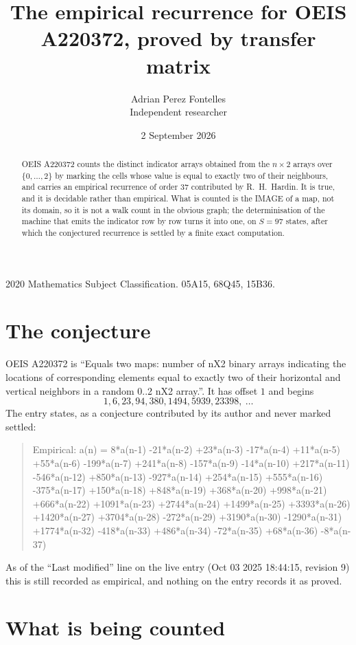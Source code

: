 \documentclass[11pt,a4paper]{article}
\title{The empirical recurrence for OEIS A220372, proved by transfer matrix}
\author{Adrian Perez Fontelles\\ \small Independent researcher}
\date{2 September 2026}
\theoremstyle{plain}
\theoremstyle{definition}
\begin{document}
\maketitle

\begin{abstract}
OEIS A220372 counts the distinct indicator arrays obtained from the $n\times2$ arrays over
$\{0,\dots,2\}$ by marking the cells whose value is equal to exactly two of their neighbours, and carries an
empirical recurrence of order $37$ contributed by R.~H.~Hardin. It is true, and it is
decidable rather than empirical. What is counted is the IMAGE of a map, not its domain, so it
is not a walk count in the obvious graph; the determinisation of the machine that emits the
indicator row by row turns it into one, on $S=97$ states, after which the conjectured
recurrence is settled by a finite exact computation.
\end{abstract}

\noindent\small 2020 Mathematics Subject Classification. 05A15, 68Q45, 15B36.\normalsize

\section{The conjecture}

OEIS A220372 is ``Equals two maps: number of nX2 binary arrays indicating the locations of corresponding elements equal to exactly two of their horizontal and vertical neighbors in a random 0..2 nX2 array.''. It has offset $1$ and begins
\[
1, 6, 23, 94, 380, 1494, 5939, 23398,\ \dots
\]
The entry states, as a conjecture contributed by its author and never marked settled:
\begin{quote}
Empirical: a(n) = 8*a(n-1) -21*a(n-2) +23*a(n-3) -17*a(n-4) +11*a(n-5) +55*a(n-6) -199*a(n-7) +241*a(n-8) -157*a(n-9) -14*a(n-10) +217*a(n-11) -546*a(n-12) +850*a(n-13) -927*a(n-14) +254*a(n-15) +555*a(n-16) -375*a(n-17) +150*a(n-18) +848*a(n-19) +368*a(n-20) +998*a(n-21) +666*a(n-22) +1091*a(n-23) +2744*a(n-24) +1499*a(n-25) +3393*a(n-26) +1420*a(n-27) +3704*a(n-28) -272*a(n-29) +3190*a(n-30) -1290*a(n-31) +1774*a(n-32) -418*a(n-33) +486*a(n-34) -72*a(n-35) +68*a(n-36) -8*a(n-37)
\end{quote}
As of the ``Last modified'' line on the live entry (Oct 03 2025 18:44:15, revision 9) this is still
recorded as empirical, and nothing on the entry records it as proved.

\section{What is being counted}
\end{document}

